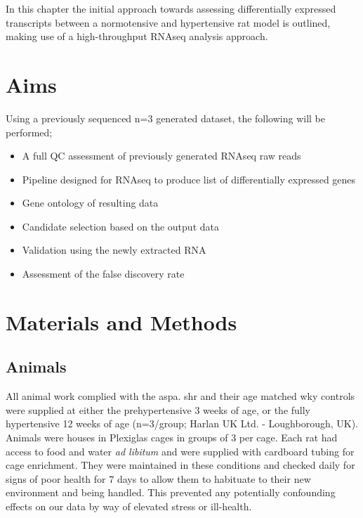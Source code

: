 In this chapter the initial approach towards assessing differentially expressed transcripts between a normotensive and hypertensive rat model is outlined, making use of a high-throughput RNAseq analysis approach. 

\section{Aims}
Using a previously sequenced n=3 generated dataset, the following will be performed;\\
\begin{itemize}
\singlespacing
  \item A full QC assessment of previously generated RNAseq raw reads \\
	\item Pipeline designed for RNAseq to produce list of differentially expressed genes \\
	\item Gene ontology of resulting data \\
	\item Candidate selection based on the output data \\
	\item Validation using the newly extracted RNA \\
	\item Assessment of the false discovery rate \\
\end{itemize}

\doublespacing
\section{Materials and Methods}

\subsection{Animals}

All animal work complied with the \acrfull{aspa}. \acrfull{shr} and their age matched \acrfull{wky} controls were supplied at either the prehypertensive 3 weeks of age, or the fully hypertensive 12 weeks of age (n=3/group; Harlan UK Ltd. - Loughborough, UK).  Animals were houses in Plexiglas cages in groups of 3 per cage. Each rat had access to food and water \textit{ad libitum} and were supplied with cardboard tubing for cage enrichment. They were maintained in these conditions and checked daily for signs of poor health for 7 days to allow them to habituate to their new environment and being handled. This prevented any potentially confounding effects on our data by way of elevated stress or ill-health. 

